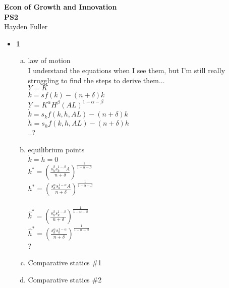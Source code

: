 \documentclass[11pt]{article}
\begin{document}
\thispagestyle{empty}   %

\begin{center}
\large
\textbf{Econ of Growth and Innovation \\
PS2}
\\Hayden Fuller
\end{center}

\begin{itemize}

\item \textbf{1} 
\begin{enumerate}[(a)]
\item law of motion
\\I understand the equations when I see them, but I'm still really 
\\struggling to find the steps to derive them...
\\$Y=K$
\\$\dot k=sf(k)-(n+\delta)k$
\\$Y=K^\alpha H^\beta(AL)^{1-\alpha-\beta}$
\\$\dot k=s_kf(k,h,AL)-(n+\delta)k$
\\$\dot h=s_hf(k,h,AL)-(n+\delta)h$
\\..?
\item equilibrium points
\\$\dot k=\dot h=0$
\\$k^*=(\frac{s_h^\beta s_k^{1-\beta}A}{n+\delta})^{\frac{1}{1-\alpha-\beta}}$
\\$h^*=(\frac{s_h^\alpha s_k^{1-\alpha}A}{n+\delta})^{\frac{1}{1-\alpha-\beta}}$
\\
\\$\hat k^*=(\frac{s_h^\beta s_k^{1-\beta}}{n+\delta})^{\frac{1}{1-\alpha-\beta}}$
\\$\hat h^*=(\frac{s_h^\alpha s_k^{1-\alpha}}{n+\delta})^{\frac{1}{1-\alpha-\beta}}$
\\?
\item Comparative statics \#1
\vspace{2in}
\item Comparative statics \#2
\vspace{2in}
\end{enumerate}
\vspace{2in}

\vspace{0.1in}


\end{itemize}
\end{document}

